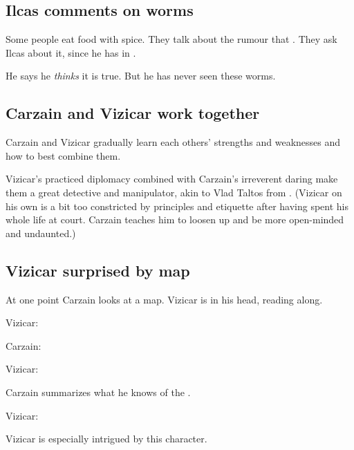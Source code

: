 \subsection{Ilcas comments on worms}
Some people eat food with \Durcaci spice. 
They talk about the rumour that . 
They ask Ilcas about it, since he has \travelled in \Durcac. 

He says he \emph{thinks} it is true. 
But he has never seen these worms. 









\subsection{Carzain and Vizicar work together}
Carzain and Vizicar gradually learn each others' strengths and weaknesses and how to best combine them. 

Vizicar's practiced diplomacy combined with Carzain's irreverent daring make them a great detective and manipulator, akin to Vlad Taltos from . 
(Vizicar on his own is a bit too constricted by principles and etiquette after having spent his whole life at court. Carzain teaches him to loosen up and be more open-minded and undaunted.)







\subsection{Vizicar surprised by map}
At one point Carzain looks at a map. 
Vizicar is in his head, reading along. 

\begin{prose}
  Vizicar: 
  
  Carzain: 
  
  Vizicar: 
  
  Carzain summarizes what he knows of the \Darkfall. 
  
  Vizicar: 
  
  Vizicar is especially intrigued by this  character. 
\end{prose}







